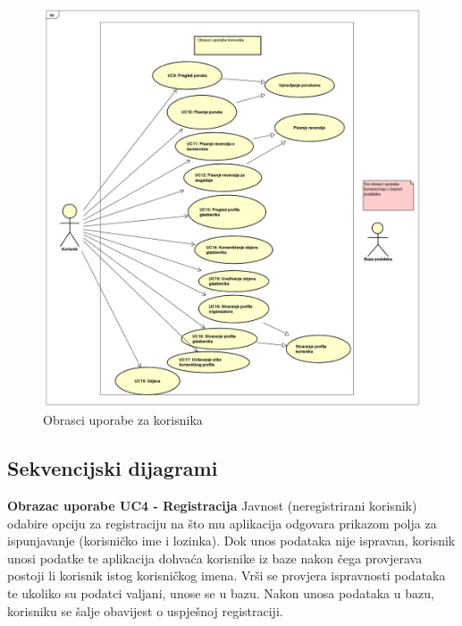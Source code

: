 		\begin{figure}[H]
			\begin{center}
				\includegraphics[width=17cm]{slike/korisnik.PNG}
			\end{center}
			\caption{Obrasci uporabe za korisnika}
			\label{fig:ou3}
		\end{figure}
				
				
			\subsection{Sekvencijski dijagrami}
				
				\textbf{Obrazac uporabe UC4 - Registracija}
				\newline
				Javnost (neregistrirani korisnik) odabire opciju za registraciju na što mu aplikacija odgovara prikazom polja za ispunjavanje (korisničko ime i lozinka). Dok unos podataka nije ispravan, korisnik unosi podatke te aplikacija dohvaća korisnike iz baze nakon čega provjerava postoji li korisnik istog korisničkog imena. Vrši se provjera ispravnosti podataka te ukoliko su podatci valjani, unose se u bazu. Nakon unosa podataka u bazu, korisniku se šalje obavijest o uspješnoj registraciji. 
				
